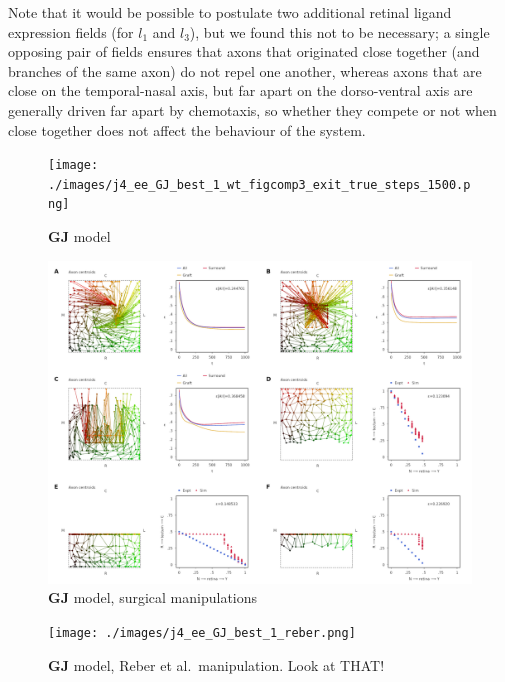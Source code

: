 \documentclass[11pt, a4paper]{article}
\begin{document}
Note that it would be possible to postulate two additional retinal ligand
expression fields (for $l_1$ and $l_3$), but we found this not to be
necessary; a single opposing pair of fields ensures that axons that originated
close together (and branches of the same axon) do not repel one another,
whereas axons that are close on the temporal-nasal axis, but far apart on the
dorso-ventral axis are generally driven far apart by chemotaxis, so whether
they compete or not when close together does not affect the behaviour of the
system.


\begin{figure}
\texttt{[image: ./images/j4\_ee\_GJ\_best\_1\_wt\_figcomp3\_exit\_true\_steps\_1500.png]}
\caption{$\mathbf{GJ}$ model}
\label{f:GJ}
\end{figure}

\begin{figure}
\includegraphics[width=\linewidth]{./images/fig_GJ_surgical.png}
\caption{$\mathbf{GJ}$ model, surgical manipulations}
\label{f:GJsurg}
\end{figure}


\begin{figure}
\texttt{[image: ./images/j4\_ee\_GJ\_best\_1\_reber.png]}
\caption{$\mathbf{GJ}$ model, Reber et al.~manipulation. Look at THAT!}
\label{f:GJreber}
\end{figure}
\end{document}
